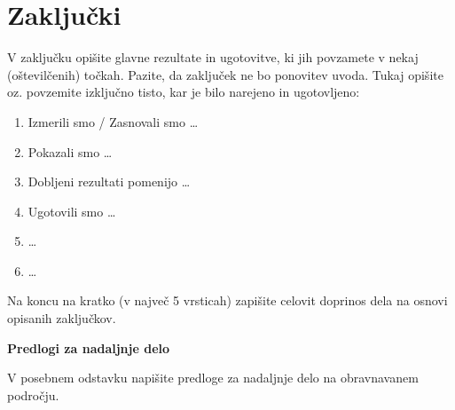 \chapter{Zaključki}\label{cha:zakljucki}

V zaključku opišite glavne rezultate in ugotovitve, ki jih povzamete v nekaj (o\-šte\-vil\-če\-nih) točkah. Pazite, da zaključek ne bo ponovitev uvoda. Tukaj opišite oz. povzemite izključno tisto, kar je bilo narejeno in ugotovljeno:
\begin{enumerate}
\item Izmerili smo / Zasnovali smo \ldots
\item Pokazali smo \ldots
\item Dobljeni rezultati pomenijo \ldots
\item Ugotovili smo \ldots
\item \ldots
\item \ldots
\end{enumerate}

Na koncu na kratko (v največ 5 vrsticah) zapišite celovit doprinos dela na osnovi opisanih zaključkov.

\textbf{Predlogi za nadaljnje delo}

V posebnem odstavku napišite predloge za nadaljnje delo na obravnavanem področju.
